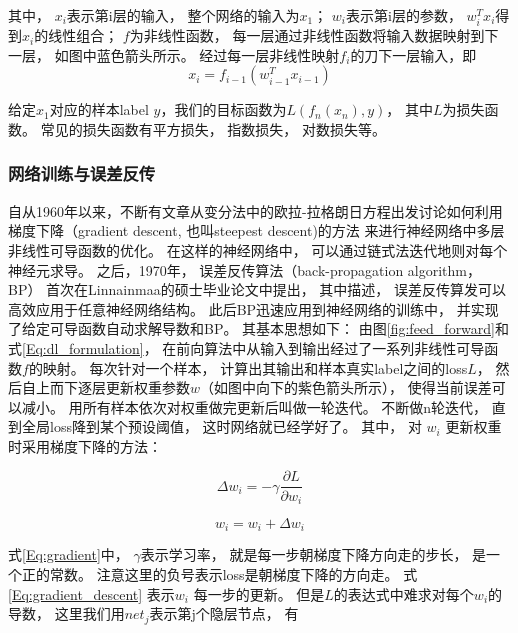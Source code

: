 其中， $x_i$表示第i层的输入， 整个网络的输入为$x_1$； $w_i$表示第i层的参数， $w_i^Tx_i$得到$x_i$的线性组合； $f$为非线性函数， 每一层通过非线性函数将输入数据映射到下一层， 如图中蓝色箭头所示。 经过每一层非线性映射$f_i$的刀下一层输入，即
\begin{equation}
 x_i = f_{i-1}(w_{i-1}^Tx_{i-1})
\end{equation}

给定$x_1$对应的样本label $y$，我们的目标函数为$L(f_n(x_n),y)$， 其中$L$为损失函数。 常见的损失函数有平方损失， 指数损失， 对数损失等。 



\subsubsection{网络训练与误差反传}

自从1960年以来，不断有文章\cite{griewank2012documenta,director1969generalized,gray1965effect,bellman1962applied,
kelley1960cutting,bryson1961diffraction,}从变分法中的欧拉-拉格朗日方程出发讨论如何利用梯度下降（gradient descent, 也叫steepest descent)的方法\cite{hadamard1908memoire} 来进行神经网络中多层非线性可导函数的优化。
在这样的神经网络中， 可以通过链式法迭代地则对每个神经元求导\cite{bellman1962applied}。 之后，1970年， 误差反传算法（back-propagation algorithm， BP）\cite{hecht1989theory,goh1995back} 首次在Linnainmaa的硕士毕业论文\cite{linnainmaa1970representation}中提出， 其中描述， 误差反传算发可以高效应用于任意神经网络结构。 此后BP迅速应用到神经网络的训练中， 并实现了给定可导函数自动求解导数和BP\cite{speelpenning1980compiling}。 其基本思想如下： 由图\ref{fig:feed_forward}和式\ref{Eq:dl_formulation}， 在前向算法中从输入到输出经过了一系列非线性可导函数$f$的映射。  每次针对一个样本， 计算出其输出和样本真实label之间的loss$L$， 然后自上而下逐层更新权重参数$w$（如图中向下的紫色箭头所示）， 使得当前误差可以减小。 用所有样本依次对权重做完更新后叫做一轮迭代。 不断做n轮迭代， 直到全局loss降到某个预设阈值， 这时网络就已经学好了。 其中， 对 $w_i$ 更新权重时采用梯度下降的方法：

\begin{equation}
\label{Eq:gradient}
	\Delta w_i = -\gamma \frac{\partial L}{\partial w_i}
\end{equation}

\begin{equation}
\label{Eq:gradient_descent}
	w_i = w_i + \Delta w_i
\end{equation}

式\ref{Eq:gradient}中， $\gamma$表示学习率， 就是每一步朝梯度下降方向走的步长， 是一个正的常数。 注意这里的负号表示loss是朝梯度下降的方向走。 式\ref{Eq:gradient_descent} 表示$w_i$ 每一步的更新。 但是$L$的表达式中难求对每个$w_i$的导数， 这里我们用$net_{j}$表示第j个隐层节点， 有

